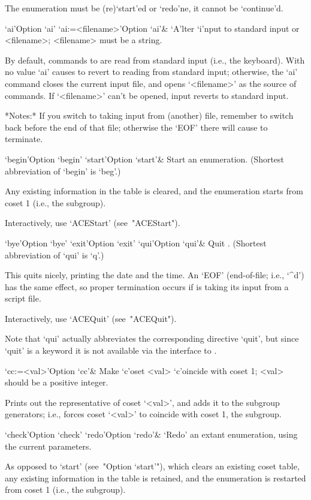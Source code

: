 The enumeration must  be  (re)`start'ed  or  `redo'ne,  it  cannot  be
`continue'd.

\>`ai'{Option `ai'}
\>`ai:=<filename>'{Option `ai'}&
`A'lter `i'nput to standard input or <filename>; <filename> must be  a
string.

By default, commands to {\ACE} are read from standard input (i.e., the
keyboard). With no value `ai' causes {\ACE} to revert to reading  from
standard input; otherwise, the `ai' command closes the  current  input
file,  and  opens  `<filename>'  as  the  source   of   commands.   If
`<filename>' can't be opened, input reverts to standard input.

*Notes:*
If you switch to taking input from (another) file, remember to  switch
back before the end of that file; otherwise the `EOF' there will cause
{\ACE} to terminate.

\>`begin'{Option `begin'}
\>`start'{Option `start'}&
Start an enumeration. (Shortest abbreviation of `begin' is `beg'.)

Any existing information in the table is cleared, and the  enumeration
starts from coset 1 (i.e., the subgroup).

Interactively, use `ACEStart' (see~"ACEStart").

\>`bye'{Option `bye'}
\>`exit'{Option `exit'}
\>`qui'{Option `qui'}&
Quit {\ACE}. (Shortest abbreviation of `qui' is `q'.)

This quits {\ACE} nicely, printing the date and  the  time.  An  `EOF'
(end-of-file; i.e., `\^{}d') has the same effect, so proper termination
occurs if {\ACE} is taking its input from a script file.

Interactively, use `ACEQuit' (see~"ACEQuit").

Note  that  `qui'  actually  abbreviates  the   corresponding   {\ACE}
directive `quit', but since `quit' is  a  {\GAP}  keyword  it  is  not
available via the {\GAP} interface to {\ACE}.

\>`cc:=<val>'{Option `cc'}&
Make `c'oset <val> `c'oincide with coset 1; <val> should be a positive
integer.

Prints out the representative of coset `<val>', and  adds  it  to  the
subgroup generators; i.e., forces coset `<val>' to coincide with coset
1, the subgroup.

\>`check'{Option `check'}
\>`redo'{Option `redo'}&
`Redo' an extant enumeration, using the current parameters.

As opposed to `start' (see~"Option `start'"), which clears an existing
coset table, any existing information in the table  is  retained,  and
the enumeration is restarted from coset 1 (i.e., the subgroup).

